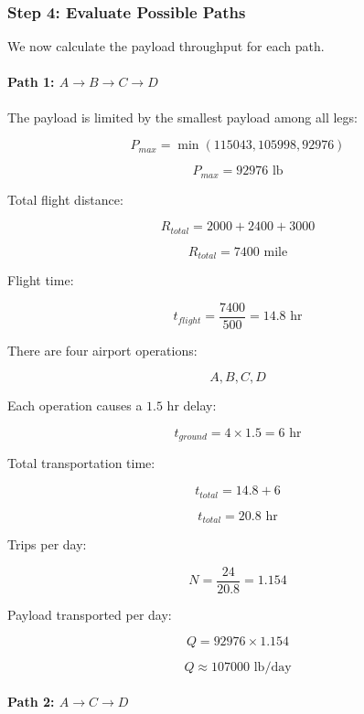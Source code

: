\documentclass{KPS_assignment}
\begin{document}

\subsubsection{Step 4: Evaluate Possible Paths}

We now calculate the payload throughput for each path.


\paragraph{Path 1: \(A\rightarrow B\rightarrow C\rightarrow D\)}

The payload is limited by the smallest payload among all legs:

\[
P_{max}=
\min(115043,105998,92976)
\]

\[
\boxed{
P_{max}=92976 \text{ lb}
}
\]

Total flight distance:

\[
R_{total}=2000+2400+3000
\]

\[
R_{total}=7400 \text{ mile}
\]

Flight time:

\[
t_{flight}=
\frac{7400}{500}
=14.8 \text{ hr}
\]

There are four airport operations:

\[
A,B,C,D
\]

Each operation causes a \(1.5\) hr delay:

\[
t_{ground}=4\times1.5=6 \text{ hr}
\]

Total transportation time:

\[
t_{total}=14.8+6
\]

\[
\boxed{
t_{total}=20.8 \text{ hr}
}
\]

Trips per day:

\[
N=
\frac{24}{20.8}
=1.154
\]

Payload transported per day:

\[
Q=
92976\times1.154
\]

\[
\boxed{
Q\approx107000 \text{ lb/day}
}
\]


\paragraph{Path 2: \(A\rightarrow C\rightarrow D\)}
\end{document}
